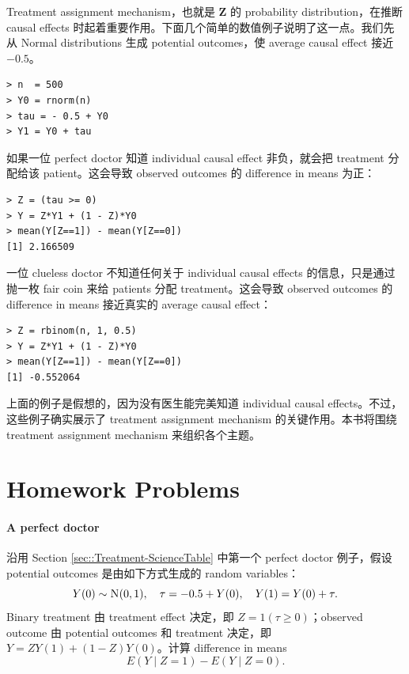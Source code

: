 Treatment assignment mechanism，也就是 $\boldsymbol{Z} $ 的 probability distribution，在推断 causal effects 时起着重要作用。下面几个简单的数值例子说明了这一点。我们先从 Normal distributions 生成 potential outcomes，使 average causal effect 接近 $-0.5$。
\begin{lstlisting}
> n  = 500
> Y0 = rnorm(n)
> tau = - 0.5 + Y0
> Y1 = Y0 + tau
\end{lstlisting} 
如果一位 perfect doctor 知道 individual causal effect 非负，就会把 treatment 分配给该 patient。这会导致 observed outcomes 的 difference in means 为正：
\begin{lstlisting}
> Z = (tau >= 0)
> Y = Z*Y1 + (1 - Z)*Y0
> mean(Y[Z==1]) - mean(Y[Z==0])
[1] 2.166509
\end{lstlisting} 
一位 clueless doctor 不知道任何关于 individual causal effects 的信息，只是通过抛一枚 fair coin 来给 patients 分配 treatment。这会导致 observed outcomes 的 difference in means 接近真实的 average causal effect：
\begin{lstlisting}
> Z = rbinom(n, 1, 0.5)
> Y = Z*Y1 + (1 - Z)*Y0
> mean(Y[Z==1]) - mean(Y[Z==0])
[1] -0.552064 
  \end{lstlisting} 
  
 上面的例子是假想的，因为没有医生能完美知道 individual causal effects。不过，这些例子确实展示了 treatment assignment mechanism 的关键作用。本书将围绕 treatment assignment mechanism 来组织各个主题。




 
\section{Homework Problems}



\paragraph{A perfect doctor}
\label{hw::perfect-doctor}

沿用 Section \ref{sec::Treatment-ScienceTable} 中第一个 perfect doctor 例子，假设 potential outcomes 是由如下方式生成的 random variables：
$$
Y(0) \sim \textsc{N}(0,1), \quad \tau = -0.5 + Y(0),\quad Y(1)  = Y(0) + \tau .
$$
Binary treatment 由 treatment effect 决定，即 $Z = 1(\tau \geq 0)$；observed outcome 由 potential outcomes 和 treatment 决定，即 $Y = ZY(1) + (1-Z) Y(0)$。计算 difference in means
$$
E(Y\mid Z=1) - E(Y\mid Z=0).
$$


